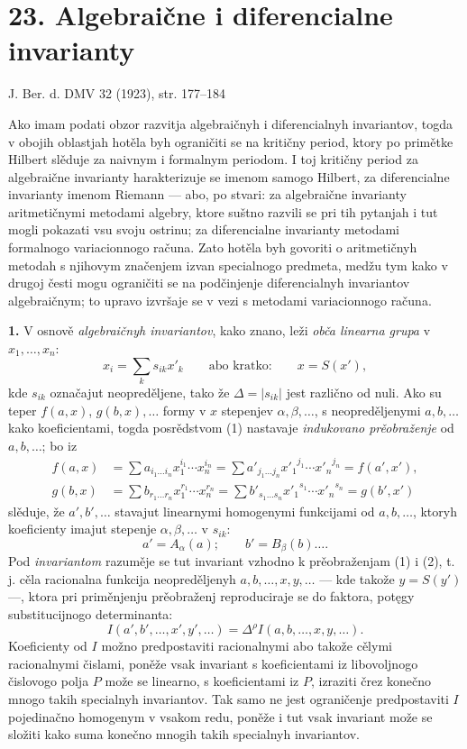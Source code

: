 \documentclass[11pt]{article}
\providecommand{\D}{\Delta}
\begin{document}
\setcounter{footnote}{0}
\section*{23. Algebraične i diferencialne invarianty}
\begin{center}
J. Ber. d. DMV 32 (1923), str. 177--184
\end{center}

Ako imam podati obzor razvitja algebraičnyh i diferencialnyh invariantov, togda v obojih oblastjah hotěla byh ograničiti se na kritičny period, ktory po primětke Hilbert slěduje za naivnym i formalnym periodom. I toj kritičny period za algebraične invarianty harakterizuje se imenom samogo Hilbert, za diferencialne invarianty imenom Riemann --- abo, po stvari: za algebraične invarianty aritmetičnymi metodami algebry, ktore suštno razvili se pri tih pytanjah i tut mogli pokazati vsu svoju ostrinu; za diferencialne invarianty metodami formalnogo variacionnogo računa. Zato hotěla byh govoriti o aritmetičnyh metodah s njihovym značenjem izvan specialnogo predmeta, medžu tym kako v drugoj česti mogu ograničiti se na podčinjenje diferencialnyh invariantov algebraičnym; to upravo izvršaje se v vezi s metodami variacionnogo računa.

\textbf{1.} V osnově \emph{algebraičnyh invariantov}, kako znano, leži \emph{obča linearna grupa} v $x_1,\ldots,x_n$:
\[
\tag{1}
x_i=\sum_k s_{ik}x'_k
\qquad\text{abo kratko:}\qquad
x=S(x'),
\]
kde $s_{ik}$ označajut neopreděljene, tako že $\D=|s_{ik}|$ jest različno od nuli. Ako su teper $f(a,x)$, $g(b,x),\ldots$ formy v $x$ stepenjev $\alpha,\beta,\ldots$, s neopreděljenymi $a,b,\ldots$ kako koeficientami, togda posrědstvom (1) nastavaje \emph{indukovano prěobraženje} od $a,b,\ldots$; bo iz
\[
\begin{aligned}
f(a,x)&=\sum a_{i_1\ldots i_n}x_1^{i_1}\cdots x_n^{i_n}
      =\sum a'_{j_1\ldots j_n}{x'_1}^{j_1}\cdots {x'_n}^{j_n}
      =f(a',x'),\\
g(b,x)&=\sum b_{r_1\ldots r_n}x_1^{r_1}\cdots x_n^{r_n}
      =\sum b'_{s_1\ldots s_n}{x'_1}^{s_1}\cdots {x'_n}^{s_n}
      =g(b',x')
\end{aligned}
\]
slěduje, že $a',b',\ldots$ stavajut linearnymi homogenymi funkcijami od $a,b,\ldots$, ktoryh koeficienty imajut stepenje $\alpha,\beta,\ldots$ v $s_{ik}$:
\[
\tag{2}
a'=A_\alpha(a);\qquad b'=B_\beta(b)\ldots .
\]
Pod \emph{invariantom} razuměje se tut invariant vzhodno k prěobraženjam (1) i (2), t. j. cěla racionalna funkcija neopreděljenyh $a,b,\ldots,x,y,\ldots$ --- kde takože $y=S(y')$ ---, ktora pri priměnjenju prěobraženj reproduciraje se do faktora, potęgy substitucijnogo determinanta:
\[
\tag{3}
I(a',b',\ldots,x',y',\ldots)=\D^\rho I(a,b,\ldots,x,y,\ldots).
\]
Koeficienty od $I$ možno predpostaviti racionalnymi abo takože cělymi racionalnymi čislami, poněže vsak invariant s koeficientami iz libovoljnogo čislovogo polja $P$ može se linearno, s koeficientami iz $P$, izraziti črez konečno mnogo takih specialnyh invariantov. Tak samo ne jest ograničenje predpostaviti $I$ pojedinačno homogenym v vsakom redu, poněže i tut vsak invariant može se složiti kako suma konečno mnogih takih specialnyh invariantov.
\end{document}

